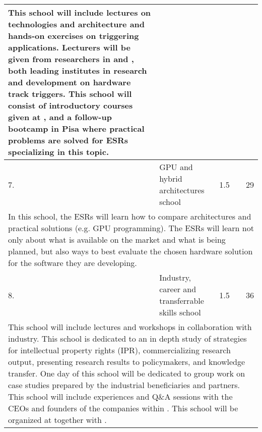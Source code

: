 \begin{center}
{\begin{tabular}{@{}lp{56mm}p{7mm}p{40mm}p{20mm}@{}}
{				This school will include lectures on technologies and architecture and hands-on exercises on triggering applications. 
				Lecturers will be given from researchers in \pisaentity and \ohioentity, both leading institutes in research and development on hardware track triggers.
				This school will consist of introductory courses given at \cernentity, and a follow-up bootcamp in Pisa where practical problems are solved for ESRs specializing in this topic. 
				
			    } \tabularnewline \hline\midrule	
			    
			    			
				\cellcolor{yellow} 7. & GPU and hybrid architectures school & 1.5 & \santiagoentity  & 29 \tabularnewline \hline
				
				\multicolumn{5}{p{\textwidth}}{				
				
				In this school, the ESRs will learn how to compare architectures and practical solutions (e.g. GPU programming). 
				The ESRs will learn not only about what is available on the market and what is being planned, but also ways to best evaluate the chosen hardware solution for the software they are developing.
				} \tabularnewline \hline\midrule				
				
				
				\cellcolor{green} 8. & Industry, career and transferrable skills school & 1.5 & \heidelbergentity  & 36 \tabularnewline \hline
				
				\multicolumn{5}{p{\textwidth}}{		
							
				This school will include lectures and workshops in collaboration with industry.
				This school is dedicated to an in depth study of strategies for intellectual property rights (IPR), commercializing research output, presenting research results to policymakers, and knowledge transfer.
				One day of this school will be dedicated to group work on case studies prepared by the industrial beneficiaries and partners. 
				This school will include experiences and Q\&A sessions with the CEOs and founders of the companies within \acronym. 
				This school will be organized at \heidelbergentity together with \ximantisentity. 
				
}
\end{tabular}}
\end{center}
